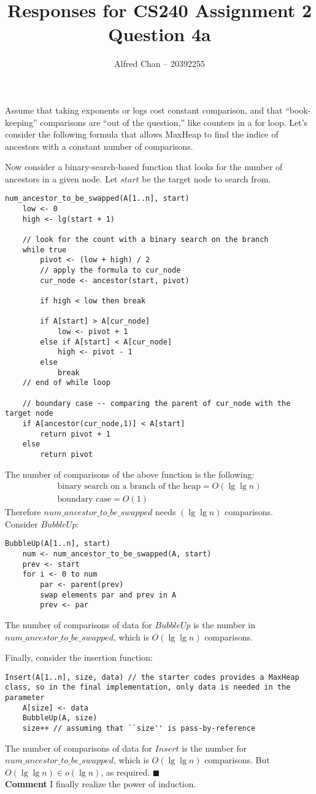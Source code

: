 \documentclass[12pt]{article}
\title{Responses for CS240 Assignment 2 Question 4a}
\author{Alfred Chan -- 20392255}
\begin{document}
\maketitle

Assume that taking exponents or logs cost constant comparison, and that ``book-keeping'' comparisons are ``out of the question,'' like counters in a for loop.
Let's consider the following formula that allows MaxHeap to find the indice of ancestors with a constant number of comparisons.

Now consider a binary-search-based function that looks for the number of ancestors in a given node. Let $start$ be the target node to search from.
\begin{lstlisting}
num_ancestor_to_be_swapped(A[1..n], start)
	low <- 0
	high <- lg(start + 1)

	// look for the count with a binary search on the branch
	while true
		pivot <- (low + high) / 2
		// apply the formula to cur_node
		cur_node <- ancestor(start, pivot)

		if high < low then break

		if A[start] > A[cur_node]
			low <- pivot + 1
		else if A[start] < A[cur_node]
			high <- pivot - 1
		else
			break
	// end of while loop

	// boundary case -- comparing the parent of cur_node with the target node
	if A[ancestor(cur_node,1)] < A[start]
		return pivot + 1
	else
		return pivot
\end{lstlisting}
The number of comparisons of the above function is the following:
\begin{align*}
\text{binary search on a branch of the heap} = O(\lg\lg n)\\
\text{boundary case} = O(1)
\end{align*}
Therefore $num\_ancestor\_to\_be\_swapped$ needs $(\lg\lg n)$ comparisons.\\
Consider $BubbleUp$:
\begin{lstlisting}
BubbleUp(A[1..n], start)
	num <- num_ancestor_to_be_swapped(A, start)
	prev <- start
	for i <- 0 to num
		par <- parent(prev)
		swap elements par and prev in A
		prev <- par
\end{lstlisting}
The number of comparisons of data for $BubbleUp$ is the number in $num\_ancestor\_to\_be\_swapped$, which is $O(\lg\lg n)$ comparisons.

Finally, consider the insertion function:
\begin{lstlisting}
Insert(A[1..n], size, data) // the starter codes provides a MaxHeap class, so in the final implementation, only data is needed in the parameter
	A[size] <- data
	BubbleUp(A, size)
	size++ // assuming that ``size'' is pass-by-reference
\end{lstlisting}
The number of comparisons of data for $Insert$ is the number for $num\_ancestor\_to\_be\_swapped$, which is $O(\lg\lg n)$ comparisons.
But $O(\lg\lg n) \in o(\lg n)$, as required.
\hfill $\blacksquare$\\
{\bf Comment} I finally realize the power of induction.
\end{document}
